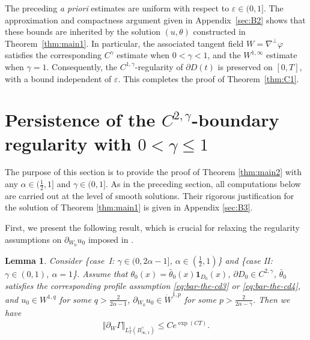 \documentclass[reqno,11pt,a4paper]{amsart}
\newtheorem{lemma}[theorem]{Lemma}
\begin{document}
The preceding \textit{{\it{a priori}}} estimates are uniform with respect to
$\varepsilon\in(0,1]$. The approximation and compactness argument
given in Appendix~\ref{sec:B2} shows that these bounds are inherited
by the solution $(u,\theta)$ constructed in
Theorem~\ref{thm:main1}. In particular, the associated tangent field
$W=\nabla^\perp\varphi$ satisfies the corresponding $C^\gamma$ estimate
when $0<\gamma<1$, and the $W^{1,\infty}$ estimate when $\gamma=1$.
Consequently, the $C^{1,\gamma}$-regularity of $\partial D(t)$ is
preserved on $[0,T]$, with a bound independent of $\varepsilon$.
This completes the proof of Theorem~\ref{thm:C1}.


\section{Persistence of the \texorpdfstring{$C^{2,\gamma}$}{C(2,gamma)}-boundary regularity with \texorpdfstring{$0<\gamma\leq1$}{0 < gamma <= 1}}\label{sec:C2}
The purpose of this section is to provide the proof of Theorem \ref{thm:main2} with any $\alpha\in(\frac{1}{2},1]$ and $\gamma\in (0,1]$. As in the preceding section, all computations below are carried out at the level of smooth solutions. Their rigorous justification for the solution of Theorem \ref{thm:main1} is given in Appendix \ref{sec:B3}.

First, we present the following result, which is crucial for relaxing the regularity assumptions on $\partial_{W_0}u_0$ imposed in \cite{LXY25}.
\begin{lemma}\label{lem:pGamma}
Consider \{\textrm{case\, I}: $\gamma\in(0,2\alpha-1]$, $\alpha\in(\tfrac{1}{2},1)$\} 
and \{\textrm{case II}: $\gamma\in(0,1)$, $\alpha=1$\}.
Assume that $\theta_0(x) = \bar{\theta}_0(x) \mathbf{1}_{D_0}(x)$, $\partial D_0\in C^{2,\gamma}$,  
$\bar\theta_0$ satisfies the corresponding profile assumption
\eqref{eq:bar-the-cd3} or \eqref{eq:bar-the-cd4}, 
and $u_0\in W^{1,q}$ for some $q>\frac{2}{2\alpha-1}$, 
$\partial_{W_0}u_0\in \dot{W}^{1,p}$ for some 
$p > \frac{2}{2\alpha-\gamma}$.
Then we have
\begin{align*}
  \Vert \partial_W \Gamma\Vert _{L^1_T(B^\gamma_{\infty,1})} \leq C e^{\exp (CT)}.
\end{align*}
\end{lemma}
\end{document}
